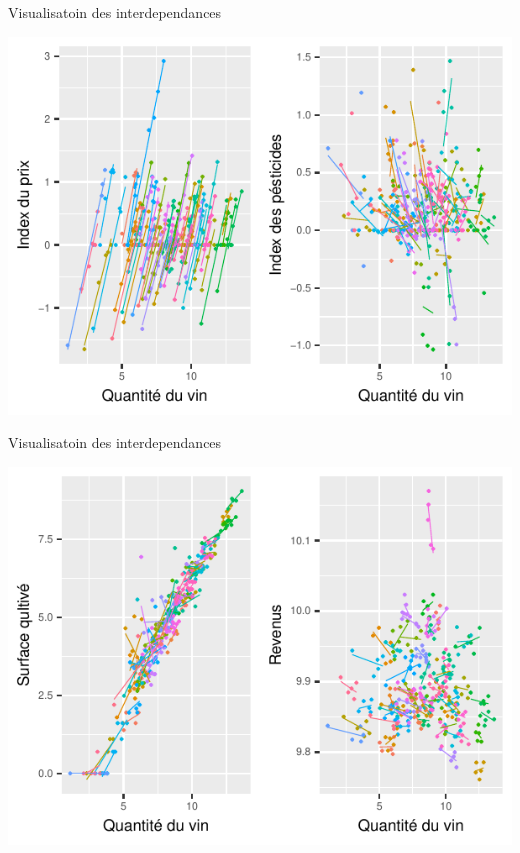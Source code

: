 \documentclass[11pt,ignorenonframetext,]{beamer}
\begin{document}
\begin{frame}{Visualisatoin des interdependances}
\protect\hypertarget{visualisatoin-des-interdependances}{}

\includegraphics{Presentation_files/figure-beamer/unnamed-chunk-12-1.pdf}

\end{frame}

\begin{frame}{Visualisatoin des interdependances}
\protect\hypertarget{visualisatoin-des-interdependances-1}{}

\includegraphics{Presentation_files/figure-beamer/unnamed-chunk-13-1.pdf}

\end{frame}
\end{document}
